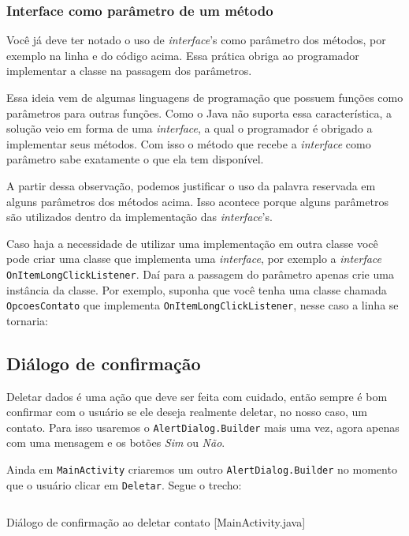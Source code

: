 \subsubsection{Interface como parâmetro de um método}

Você já deve ter notado o uso de \textit{interface}'s como parâmetro dos métodos, por exemplo
na linha  e  do código acima. Essa prática obriga ao programador implementar
a classe na passagem dos parâmetros.

Essa ideia vem de algumas linguagens de programação que possuem funções como parâmetros para outras funções. Como o Java
não suporta essa característica, a solução veio em forma de uma \textit{interface}, a qual o programador
é obrigado a implementar seus métodos. Com isso o método que recebe a \textit{interface} como parâmetro
sabe exatamente o que ela tem disponível.

A partir dessa observação, podemos justificar o uso da palavra reservada  em alguns
parâmetros dos métodos acima. Isso acontece porque alguns parâmetros são utilizados dentro da implementação
das \textit{interface}'s.

Caso haja a necessidade de utilizar uma implementação em outra classe você pode criar uma classe que
implementa uma \textit{interface}, por exemplo a \textit{interface} \texttt{OnItemLongClickListener}.
Daí para a passagem do parâmetro apenas crie uma instância da classe. Por exemplo, suponha que você
tenha uma classe chamada \texttt{OpcoesContato} que implementa \texttt{OnItemLongClickListener}, nesse
caso a linha  se tornaria:


\subsection{Diálogo de confirmação}

Deletar dados é uma ação que deve ser feita com cuidado, então sempre é bom confirmar com
o usuário se ele deseja realmente deletar, no nosso caso, um contato. Para isso usaremos o
\texttt{AlertDialog.Builder} mais uma vez, agora apenas com uma mensagem e os botões
\textit{Sim} ou \textit{Não}.


Ainda em \texttt{MainActivity} criaremos um outro \texttt{AlertDialog.Builder} no momento que o usuário
clicar em \texttt{Deletar}. Segue o trecho:

\begin{listing}[H]
  \inputminted[linenos=true,frame=bottomline,tabsize=3]{ java }{ source/MainActivity-9.java }
  \caption{Diálogo de confirmação ao deletar contato [MainActivity.java]}
\end{listing}

